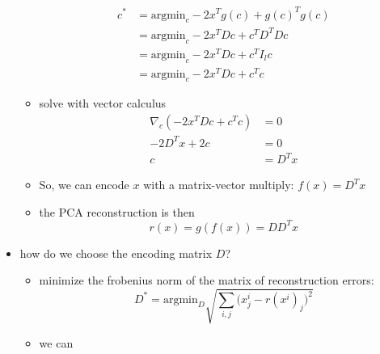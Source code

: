 \begin{itemize}
\begin{itemize}
        \begin{align}
            c^* &= \text{argmin}_c - 2x^Tg(c) + g(c)^Tg(c) \\
            &= \text{argmin}_c -2x^T Dc + c^T D^T Dc \\
            &= \text{argmin}_c -2x^T Dc + c^T I_lc \\
            &= \text{argmin}_c -2x^T Dc + c^Tc 
        \end{align}
        \item solve with vector calculus
        \begin{align}
            \nabla_c (-2x^T Dc + c^T c) &= 0 \\
            -2D^Tx + 2c &= 0 \\
            c &= D^Tx
        \end{align}
        \item So, we can encode $x$ with a matrix-vector multiply: $f(x) = D^Tx$
        \item the PCA reconstruction is then
        $$ r(x) = g(f(x)) = DD^T x$$
    \end{itemize}
    \item how do we choose the encoding matrix $D$?
    \begin{itemize}
        \item minimize the frobenius norm of the matrix of reconstruction errors:
        $$ D^* = \text{argmin}_D \sqrt{\sum_{i,j} \Big( x_j^i - r(x^i)_j \Big)^2} $$
        \item we can 
    \end{itemize}
\end{itemize}


